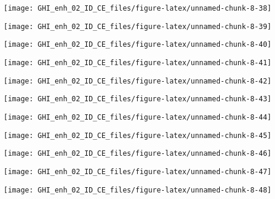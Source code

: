 \documentclass[
  10pt,
  a4paper,oneside]{article}
\begin{document}
\begin{center}\texttt{[image: GHI\_enh\_02\_ID\_CE\_files/figure-latex/unnamed-chunk-8-38]} \end{center}

\begin{center}\texttt{[image: GHI\_enh\_02\_ID\_CE\_files/figure-latex/unnamed-chunk-8-39]} \end{center}

\begin{center}\texttt{[image: GHI\_enh\_02\_ID\_CE\_files/figure-latex/unnamed-chunk-8-40]} \end{center}

\begin{center}\texttt{[image: GHI\_enh\_02\_ID\_CE\_files/figure-latex/unnamed-chunk-8-41]} \end{center}

\begin{center}\texttt{[image: GHI\_enh\_02\_ID\_CE\_files/figure-latex/unnamed-chunk-8-42]} \end{center}

\begin{center}\texttt{[image: GHI\_enh\_02\_ID\_CE\_files/figure-latex/unnamed-chunk-8-43]} \end{center}

\begin{center}\texttt{[image: GHI\_enh\_02\_ID\_CE\_files/figure-latex/unnamed-chunk-8-44]} \end{center}

\begin{center}\texttt{[image: GHI\_enh\_02\_ID\_CE\_files/figure-latex/unnamed-chunk-8-45]} \end{center}

\begin{center}\texttt{[image: GHI\_enh\_02\_ID\_CE\_files/figure-latex/unnamed-chunk-8-46]} \end{center}

\begin{center}\texttt{[image: GHI\_enh\_02\_ID\_CE\_files/figure-latex/unnamed-chunk-8-47]} \end{center}

\begin{center}\texttt{[image: GHI\_enh\_02\_ID\_CE\_files/figure-latex/unnamed-chunk-8-48]} \end{center}
\end{document}

